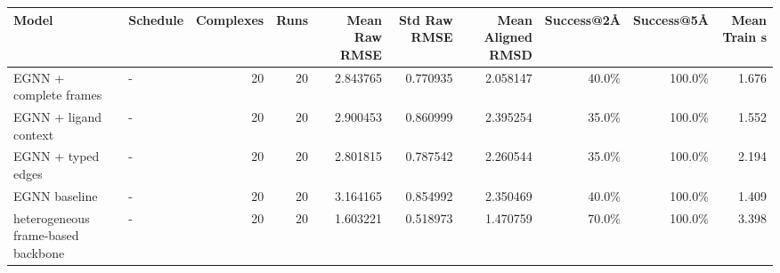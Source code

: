 \begin{tabular}{llrrrrrrrr}
\toprule
Model & Schedule & Complexes & Runs & Mean Raw RMSE & Std Raw RMSE & Mean Aligned RMSD & Success@2\AA{} & Success@5\AA{} & Mean Train s \\
\midrule
EGNN + complete frames & - & 20 & 20 & 2.843765 & 0.770935 & 2.058147 & 40.0\% & 100.0\% & 1.676 \\
EGNN + ligand context & - & 20 & 20 & 2.900453 & 0.860999 & 2.395254 & 35.0\% & 100.0\% & 1.552 \\
EGNN + typed edges & - & 20 & 20 & 2.801815 & 0.787542 & 2.260544 & 35.0\% & 100.0\% & 2.194 \\
EGNN baseline & - & 20 & 20 & 3.164165 & 0.854992 & 2.350469 & 40.0\% & 100.0\% & 1.409 \\
heterogeneous frame-based backbone & - & 20 & 20 & 1.603221 & 0.518973 & 1.470759 & 70.0\% & 100.0\% & 3.398 \\
\bottomrule
\end{tabular}
